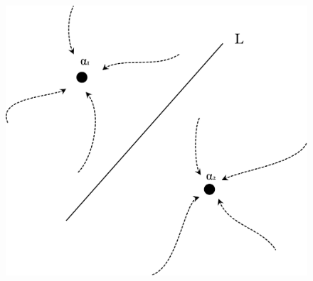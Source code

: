 \documentclass[twoside,10pt]{report}
\begin{document}
\begin{figure}[H]
	\centering
	\includegraphics[scale=.1]{fig/quadratic_newton_convergence.pdf}
\end{figure}
\end{document}
